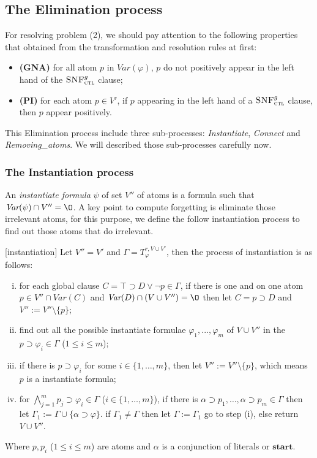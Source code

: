 \documentclass[runningheads]{llncs}
\newcommand{\Var}{\textit{Var}}
\newcommand{\start}{\textbf{start}}
\newcommand{\CTLsnf}{{\textsc{SNF}_{\textsc{ctl}}^g}}
\begin{document}
\subsection{The Elimination process}
For resolving problem (2), we should pay attention to the following properties that obtained from the transformation and resolution rules at first:
\begin{itemize}
  \item \textbf{(GNA)} for all atom $p$ in $\Var(\varphi)$, $p$ do not positively appear in the left hand of the $\CTLsnf$ clause;
  \item \textbf{(PI)} for each atom $p\in V'$, if $p$ appearing in the left hand of a $\CTLsnf$ clause, then $p$ appear positively.
\end{itemize}

This Elimination process include three sub-processes: \emph{Instantiate}, \emph{Connect} and \emph{Removing\_atoms}. We will described those sub-processes carefully now.
\subsubsection{The Instantiation process}
An \emph{instantiate formula} $\psi$ of set $V''$ of atoms is a formula such that $\Var(\psi) \cap V'' ={\O}$. A key point to compute forgetting is eliminate those irrelevant atoms, for this purpose, we define the follow instantiation process to find out those atoms that do irrelevant.
\begin{definition}\label{def:subst}
[instantiation] Let $V''=V'$ and $\Gamma=T_{\varphi}^{r,V \cup V'}$, then the process of instantiation is as follows:
\begin{enumerate}[(i)]
  \item for each global clause $C= \top \supset D \vee \neg p \in \Gamma$, if there is one and on one atom $p \in V''\cap \Var(C)$  and $\Var(D) \cap (V \cup V'')= {\O}$ then let $C = p \supset D$ and $V'':=V''\setminus \{p\}$;
  \item find out all the possible instantiate formulae $\varphi_1, ..., \varphi_m$ of $V \cup V''$ in the $p\supset \varphi_i \in \Gamma$ ($1\leq i\leq m$);
  \item if there is $p\supset \varphi_i$ for some $i\in \{1,\dots, m\}$, then let $V'':=V''\setminus \{p\}$, which means $p$ is a instantiate formula;
  \item for $\bigwedge_{j=1}^m p_j \supset \varphi_i \in \Gamma$ ($i\in \{1,\dots, m\}$), if there is $\alpha \supset p_1,\dots, \alpha \supset p_m \in \Gamma$ then let $\Gamma_1 := \Gamma \cup \{\alpha \supset \varphi\}$. if $\Gamma_1\neq \Gamma$ then let $\Gamma:=\Gamma_1$ go to step (i), else return $V \cup V''$.
\end{enumerate}
Where $p, p_i$ ($1 \leq i\leq m$) are atoms and $\alpha$ is a conjunction of literals or $\start$.
\end{definition}
\end{document}
